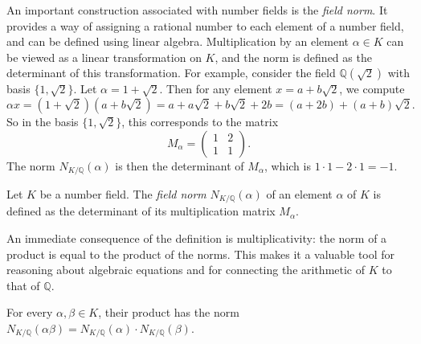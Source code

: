 An important construction associated with number fields is the \emph{field norm}.
It provides a way of assigning a rational number to each element of a number field,
and can be defined using linear algebra.
Multiplication by an element $α ∈ K$ can be viewed as a linear transformation on $K$,
and the norm is defined as the determinant of this transformation.
For example, consider the field $ℚ(\sqrt{2})$ with basis $\{1, \sqrt{2}\}$.
Let $α = 1 + \sqrt{2}$.
Then for any element $x = a + b \sqrt{2}$, we compute
\[
  αx = (1 + \sqrt{2})(a + b \sqrt{2}) = a + a \sqrt{2} + b \sqrt{2} + 2b = (a + 2b) + (a + b)\sqrt{2}.
\]
So in the basis $\{1, \sqrt{2}\}$, this corresponds to the matrix
\[
  M_α =
  \begin{pmatrix}
    1 & 2 \\
    1 & 1
  \end{pmatrix}.
\]
The norm $N_{K/ℚ}(α)$ is then the determinant of $M_α$, which is $1 \cdot 1 - 2 \cdot 1 = -1$.

\begin{definition}
  Let $K$ be a number field.
  The \emph{field norm} $N_{K/ℚ}(α)$ of an element $α$ of $K$ is defined as the
  determinant of its multiplication matrix $M_α$.
\end{definition}

An immediate consequence of the definition is multiplicativity:
the norm of a product is equal to the product of the norms.
This makes it a valuable tool for reasoning about algebraic equations
and for connecting the arithmetic of $K$ to that of $ℚ$.

\begin{lemma}
  For every $α, β ∈ K$, their product has the norm $N_{K/ℚ}(αβ) = N_{K/ℚ}(α) · N_{K/ℚ}(β)$.
\end{lemma}
